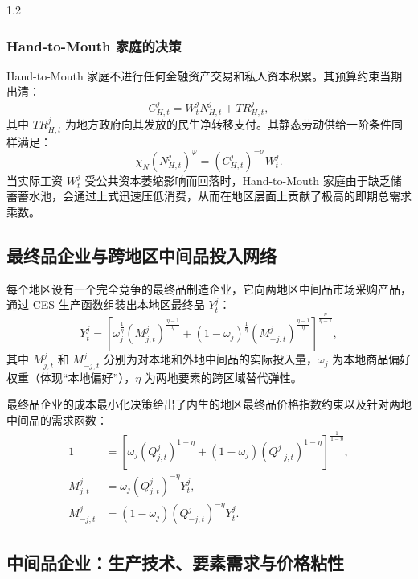 \documentclass[12pt,UTF8]{ctexart}
\begin{document}
\begin{spacing}{1.2}
		\subsubsection{Hand-to-Mouth 家庭的决策}
		
		Hand-to-Mouth 家庭不进行任何金融资产交易和私人资本积累。其预算约束当期出清：
		\begin{equation}
			C_{H,t}^j=W_t^jN_{H,t}^j+TR_{H,t}^j,
			\label{eq:budget_H}
		\end{equation}
		其中 $TR_{H,t}^j$ 为地方政府向其发放的民生净转移支付。其静态劳动供给一阶条件同样满足：
		\begin{equation}
			\chi_N(N_{H,t}^j)^{\varphi}=(C_{H,t}^j)^{-\sigma}W_t^j.
			\label{eq:labor_H}
		\end{equation}
		当实际工资 $W_t^j$ 受公共资本萎缩影响而回落时，Hand-to-Mouth 家庭由于缺乏储蓄蓄水池，会通过上式迅速压低消费，从而在地区层面上贡献了极高的即期总需求乘数。
		
		\subsection{最终品企业与跨地区中间品投入网络}
		
		每个地区设有一个完全竞争的最终品制造企业，它向两地区中间品市场采购产品，通过 CES 生产函数组装出本地区最终品 $Y_t^j$：
		\begin{equation}
			Y_t^j=
			\left[
			\omega_j^{\frac{1}{\eta}}(M_{j,t}^j)^{\frac{\eta-1}{\eta}}
			+(1-\omega_j)^{\frac{1}{\eta}}(M_{-j,t}^j)^{\frac{\eta-1}{\eta}}
			\right]^{\frac{\eta}{\eta-1}},
			\label{eq:final_production}
		\end{equation}
		其中 $M_{j,t}^j$ 和 $M_{-j,t}^j$ 分别为对本地和外地中间品的实际投入量，$\omega_j$ 为本地商品偏好权重（体现“本地偏好”），$\eta$ 为两地要素的跨区域替代弹性。
		
		最终品企业的成本最小化决策给出了内生的地区最终品价格指数约束以及针对两地中间品的需求函数：
		\begin{align}
			1 &=\left[
			\omega_j(Q_{j,t}^j)^{1-\eta}
			+(1-\omega_j)(Q_{-j,t}^j)^{1-\eta}
			\right]^{\frac{1}{1-\eta}}, \label{eq:final_price_index}\\
			M_{j,t}^j &=\omega_j(Q_{j,t}^j)^{-\eta}Y_t^j, \label{eq:demand_local}\\
			M_{-j,t}^j &=(1-\omega_j)(Q_{-j,t}^j)^{-\eta}Y_t^j.
			\label{eq:demand_foreign}
		\end{align}
		
		\subsection{中间品企业：生产技术、要素需求与价格粘性}
		

\end{spacing}
\end{document}
